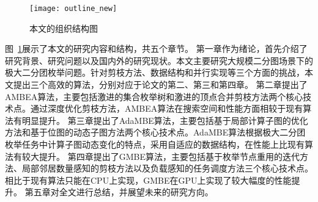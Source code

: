 \begin{figure} [ht]
  \centering
  \texttt{[image: outline\_new]}
  \caption{本文的组织结构图}
  \label{fig:outline}
\end{figure}


图~\ref{fig:outline}展示了本文的研究内容和结构，共五个章节。
%
第一章作为绪论，首先介绍了研究背景、研究问题以及国内外的研究现状。本文主要研究大规模二分图场景下的极大二分团枚举问题。针对剪枝方法、数据结构和并行实现等三个方面的挑战，本文提出三个高效的算法，分别对应于论文的第二、第三和第四章。
%
第二章提出了AMBEA算法，主要包括激进的集合枚举树和激进的顶点合并剪枝方法两个核心技术点。通过深度优化剪枝方法，AMBEA算法在搜索空间和性能方面相较于现有算法有明显提升。
%
第三章提出了AdaMBE算法，主要包括基于局部计算子图的优化方法和基于位图的动态子图方法两个核心技术点。AdaMBE算法根据极大二分团枚举任务中计算子图动态变化的特点，采用自适应的数据结构，在性能上比现有算法有较大提升。
%
第四章提出了GMBE算法，主要包括基于枚举节点重用的迭代方法、局部邻居数量感知的剪枝方法以及负载感知的任务调度方法三个核心技术点。相比于现有算法只能在CPU上实现，GMBE在GPU上实现了较大幅度的性能提升。
%
第五章对全文进行总结，并展望未来的研究方向。















